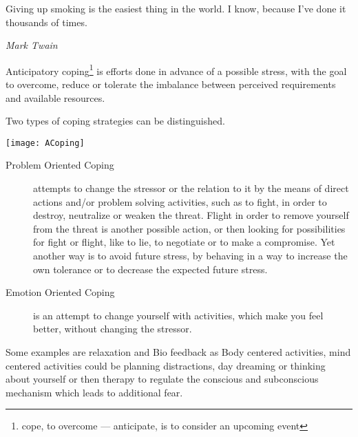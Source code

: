 \documentclass[../Book.Stress_regulation.tex]{subfiles}
\begin{document}

\epigraph{Giving up smoking is the easiest thing in the world. I know, because I've done it thousands of times.}{\textit{Mark Twain}}

Anticipatory coping\footnote{cope, to overcome --- anticipate, is to consider an upcoming event} is efforts done {in advance} of a possible stress,  with the goal to {overcome}, reduce or tolerate the {imbalance between perceived requirements and available resources}.

Two types of coping strategies can be distinguished.

\texttt{[image: ACoping]}\label{sf:coping}

 \begin{description}
\item[Problem Oriented Coping] attempts to change the stressor or the relation to it by the means of {direct actions} and/or problem solving activities, such as to fight, in order to destroy, neutralize or weaken the threat. Flight in order to remove yourself from the threat is another possible action, or then looking for possibilities for fight or flight, like to lie, to negotiate or to make a compromise. Yet another way is to avoid future stress, by behaving in a way to increase the own tolerance or to decrease the expected future stress.
\item[Emotion Oriented Coping] is an attempt to change yourself with activities, which make you {feel better}, without changing the stressor.
\end{description}

Some examples are relaxation and Bio feedback as Body centered activities, mind centered activities could be planning distractions, day dreaming or thinking about yourself or then therapy to regulate the conscious and subconscious mechanism which leads to additional fear.
\end{document}
